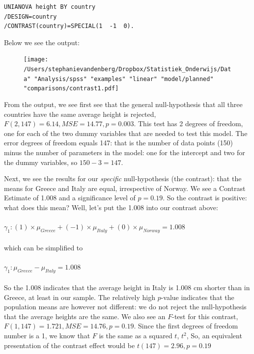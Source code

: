 \documentclass[]{report}\usepackage[]{graphicx}\usepackage[]{color}
\begin{document}
\begin{verbatim}
UNIANOVA height BY country
/DESIGN=country
/CONTRAST(country)=SPECIAL(1  -1  0).
\end{verbatim}

Below we see the output:
\begin{figure}[h]
    \begin{center}
       \texttt{[image: /Users/stephanievandenberg/Dropbox/Statistiek\_Onderwijs/Data" "Analysis/spss" "examples" "linear" "model/planned" "comparisons/contrast1.pdf]}
    \end{center}
\end{figure}

From the output, we see first see that the general null-hypothesis that all three countries have the same average height is rejected, $F(2, 147)= 6.14, MSE=14.77, p = 0.003$. This test has 2 degrees of freedom, one for each of the two dummy variables that are needed to test this model. The error degrees of freedom equals 147: that is the number of data points (150) minus the number of parameters in the model: one for the intercept and two for the dummy variables, so $150-3=147$.

Next, we see the results for our \textit{specific} null-hypothesis (the contrast): that the means for Greece and Italy are equal, irrespective of Norway. We see a Contrast Estimate of 1.008 and a significance level of $p=0.19$. So the contrast is positive: what does this mean? Well, let's put the 1.008 into our contrast above:
\\
\\
$\gamma_1: (1)\times \mu_{Greece} + (-1) \times \mu_{Italy} + (0) \times \mu_{Norway} = 1.008$
\\
\\
which can be simplified to
\\
\\
$\gamma_1:  \mu_{Greece} - \mu_{Italy}  =  1.008$
\\
\\
So the 1.008 indicates that the average height in Italy is 1.008 cm shorter than in Greece, at least in our sample. The relatively high $p$-value indicates that the population means are however not different: we do not reject the null-hypothesis that the average heights are the same.
We also see an $F$-test for this contrast, $F(1, 147)=1.721, MSE= 14.76, p=0.19$.
Since the first degrees of freedom number is a 1, we know that $F$ is the same as a squared $t$, $t^2$, So, an equivalent presentation of the contrast effect would be $t(147)=2.96, p=0.19$
\end{document}
